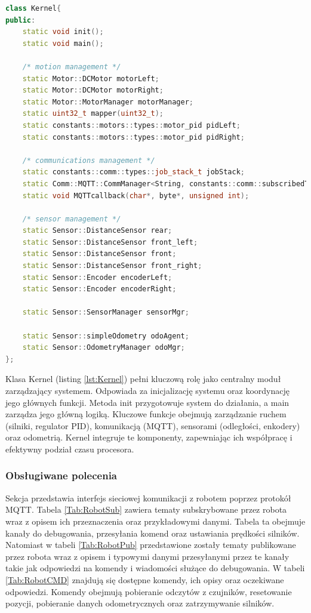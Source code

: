\documentclass[12pt,twoside]{article}
\begin{document}
\begin{lstlisting}[language=C++, caption={Klasa Kernel}, label={lst:Kernel}]
class Kernel{
public:
    static void init();
    static void main();
    
    /* motion management */
    static Motor::DCMotor motorLeft;
    static Motor::DCMotor motorRight;
    static Motor::MotorManager motorManager;
    static uint32_t mapper(uint32_t);
    static constants::motors::types::motor_pid pidLeft;
    static constants::motors::types::motor_pid pidRight;

    /* communications management */
    static constants::comm::types::job_stack_t jobStack;
    static Comm::MQTT::CommManager<String, constants::comm::subscribedTopics> commMgr;
    static void MQTTcallback(char*, byte*, unsigned int);

    /* sensor management */
    static Sensor::DistanceSensor rear;
    static Sensor::DistanceSensor front_left;
    static Sensor::DistanceSensor front;
    static Sensor::DistanceSensor front_right;
    static Sensor::Encoder encoderLeft;
    static Sensor::Encoder encoderRight;

    static Sensor::SensorManager sensorMgr;

    static Sensor::simpleOdometry odoAgent;
    static Sensor::OdometryManager odoMgr;
};    
\end{lstlisting}

Klasa Kernel (listing \ref{lst:Kernel}) pełni kluczową rolę jako centralny moduł zarządzający systemem. Odpowiada za inicjalizację systemu oraz koordynację jego głównych funkcji. Metoda init przygotowuje system do działania, a main zarządza jego główną logiką. Kluczowe funkcje obejmują zarządzanie ruchem (silniki, regulator PID), komunikacją (MQTT), sensorami (odległości, enkodery) oraz odometrią. Kernel integruje te komponenty, zapewniając ich współpracę i efektywny podział czasu procesora.

\subsubsection{Obsługiwane polecenia}

Sekcja przedstawia interfejs sieciowej komunikacji z robotem poprzez protokół MQTT. Tabela \ref{Tab:RobotSub} zawiera tematy subskrybowane przez robota wraz z opisem ich przeznaczenia oraz przykładowymi danymi. Tabela ta obejmuje kanały do debugowania, przesyłania komend oraz ustawiania prędkości silników. Natomiast w tabeli \ref{Tab:RobotPub} przedstawione zostały tematy publikowane przez robota wraz z opisem i typowymi danymi przesyłanymi przez te kanały takie jak odpowiedzi na komendy i wiadomości służące do debugowania. W tabeli \ref{Tab:RobotCMD} znajdują się dostępne komendy, ich opisy oraz oczekiwane odpowiedzi. Komendy obejmują pobieranie odczytów z czujników, resetowanie pozycji, pobieranie danych odometrycznych oraz zatrzymywanie silników.
\end{document}
